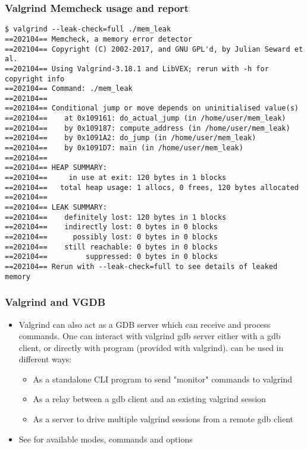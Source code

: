 \begin{frame}[fragile]
  \frametitle{Valgrind Memcheck usage and report}
  \begin{block}{}
    \begin{verbatim}
$ valgrind --leak-check=full ./mem_leak
==202104== Memcheck, a memory error detector
==202104== Copyright (C) 2002-2017, and GNU GPL'd, by Julian Seward et al.
==202104== Using Valgrind-3.18.1 and LibVEX; rerun with -h for copyright info
==202104== Command: ./mem_leak
==202104==
==202104== Conditional jump or move depends on uninitialised value(s)
==202104==    at 0x109161: do_actual_jump (in /home/user/mem_leak)
==202104==    by 0x109187: compute_address (in /home/user/mem_leak)
==202104==    by 0x1091A2: do_jump (in /home/user/mem_leak)
==202104==    by 0x1091D7: main (in /home/user/mem_leak)
==202104==
==202104== HEAP SUMMARY:
==202104==     in use at exit: 120 bytes in 1 blocks
==202104==   total heap usage: 1 allocs, 0 frees, 120 bytes allocated
==202104==
==202104== LEAK SUMMARY:
==202104==    definitely lost: 120 bytes in 1 blocks
==202104==    indirectly lost: 0 bytes in 0 blocks
==202104==      possibly lost: 0 bytes in 0 blocks
==202104==    still reachable: 0 bytes in 0 blocks
==202104==         suppressed: 0 bytes in 0 blocks
==202104== Rerun with --leak-check=full to see details of leaked memory
    \end{verbatim}
  \end{block}
\end{frame}


\begin{frame}[fragile]
  \frametitle{Valgrind and VGDB}
  \begin{itemize}
    \item Valgrind can also act as a GDB server which can receive and process
    commands. One can interact with valgrind gdb server either with a gdb
    client, or directly with  program (provided with valgrind).
     can be used in different ways:
    \begin{itemize}
      \item As a standalone CLI program to send "monitor" commands to valgrind
      \item As a relay between a gdb client and an existing valgrind session
      \item As a server to drive multiple valgrind sessions from a remote gdb
      client
    \end{itemize}
    \item See  for available modes, commands and options
    \end{itemize}
\end{frame}


